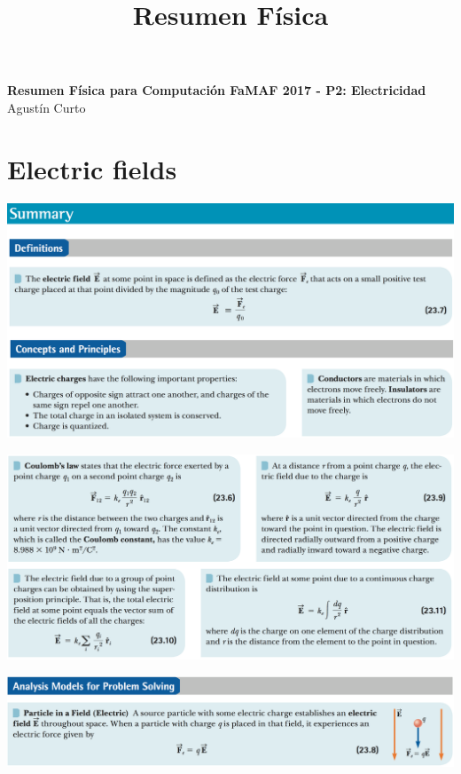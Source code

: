 \documentclass[12pt,a4paper]{article}
\title{Resumen Física}
\newcommand{\N}{\noindent}
\begin{document}
	\begin{center}
		\Huge \textbf{Resumen Física para Computación FaMAF 2017 - P2: Electricidad} \\
		\vspace{3mm}
		\large Agustín Curto
	\end{center}

	\section{Electric fields}
		\N \includegraphics[scale=.42]{1_a.png}
		
		\vspace{2mm}
		\N \includegraphics[scale=.42]{1_b.png}
		
		\vspace{2mm}
		\N \includegraphics[scale=.42]{1_c.png}
		
\end{document}
